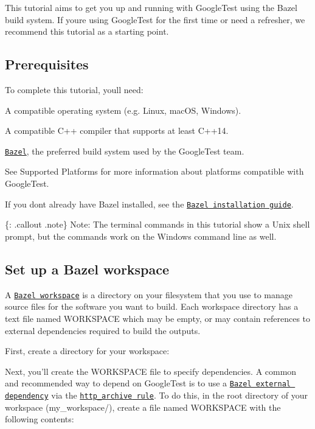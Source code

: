 This tutorial aims to get you up and running with Google\+Test using the Bazel build system. If you\textquotesingle{}re using Google\+Test for the first time or need a refresher, we recommend this tutorial as a starting point.

\subsection*{Prerequisites}

To complete this tutorial, you\textquotesingle{}ll need\+:


\begin{DoxyItemize}
\item A compatible operating system (e.\+g. Linux, mac\+OS, Windows).
\item A compatible C++ compiler that supports at least C++14.
\item \href{https://bazel.build/}{\tt Bazel}, the preferred build system used by the Google\+Test team.
\end{DoxyItemize}

See Supported Platforms for more information about platforms compatible with Google\+Test.

If you don\textquotesingle{}t already have Bazel installed, see the \href{https://bazel.build/install}{\tt Bazel installation guide}.

\{\+: .callout .note\} Note\+: The terminal commands in this tutorial show a Unix shell prompt, but the commands work on the Windows command line as well.

\subsection*{Set up a Bazel workspace}

A \href{https://docs.bazel.build/versions/main/build-ref.html#workspace}{\tt Bazel workspace} is a directory on your filesystem that you use to manage source files for the software you want to build. Each workspace directory has a text file named {\ttfamily W\+O\+R\+K\+S\+P\+A\+CE} which may be empty, or may contain references to external dependencies required to build the outputs.

First, create a directory for your workspace\+:




Next, you’ll create the {\ttfamily W\+O\+R\+K\+S\+P\+A\+CE} file to specify dependencies. A common and recommended way to depend on Google\+Test is to use a \href{https://docs.bazel.build/versions/main/external.html}{\tt Bazel external dependency} via the \href{https://docs.bazel.build/versions/main/repo/http.html#http_archive}{\tt {\ttfamily http\+\_\+archive} rule}. To do this, in the root directory of your workspace ({\ttfamily my\+\_\+workspace/}), create a file named {\ttfamily W\+O\+R\+K\+S\+P\+A\+CE} with the following contents\+:


